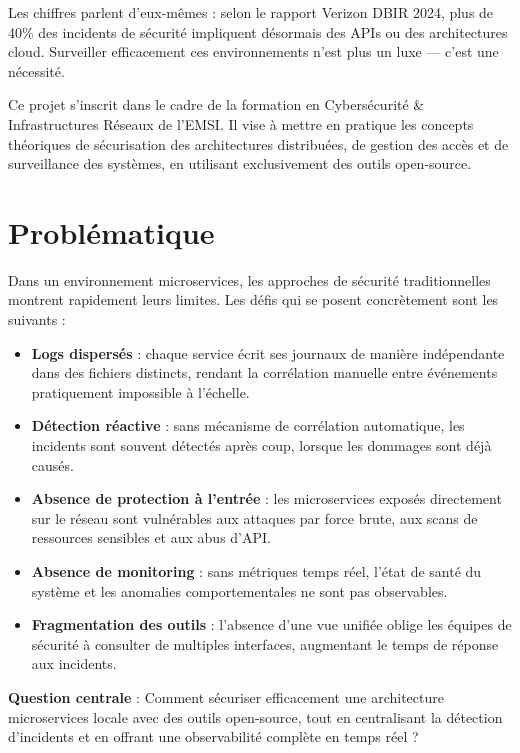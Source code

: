 \documentclass[12pt, a4paper]{report}
\begin{document}
Les chiffres parlent d'eux-mêmes : selon le rapport Verizon DBIR 2024, plus de 40\% des incidents de sécurité impliquent désormais des APIs ou des architectures cloud. Surveiller efficacement ces environnements n'est plus un luxe — c'est une nécessité.

\begin{infobox}
Ce projet s'inscrit dans le cadre de la formation en Cybersécurité \& Infrastructures Réseaux de l'EMSI. Il vise à mettre en pratique les concepts théoriques de sécurisation des architectures distribuées, de gestion des accès et de surveillance des systèmes, en utilisant exclusivement des outils open-source.
\end{infobox}

\section{Problématique}

Dans un environnement microservices, les approches de sécurité traditionnelles montrent rapidement leurs limites. Les défis qui se posent concrètement sont les suivants :

\begin{itemize}[leftmargin=*]
  \item \textbf{Logs dispersés} : chaque service écrit ses journaux de manière indépendante dans des fichiers distincts, rendant la corrélation manuelle entre événements pratiquement impossible à l'échelle.
  \item \textbf{Détection réactive} : sans mécanisme de corrélation automatique, les incidents sont souvent détectés après coup, lorsque les dommages sont déjà causés.
  \item \textbf{Absence de protection à l'entrée} : les microservices exposés directement sur le réseau sont vulnérables aux attaques par force brute, aux scans de ressources sensibles et aux abus d'API.
  \item \textbf{Absence de monitoring} : sans métriques temps réel, l'état de santé du système et les anomalies comportementales ne sont pas observables.
  \item \textbf{Fragmentation des outils} : l'absence d'une vue unifiée oblige les équipes de sécurité à consulter de multiples interfaces, augmentant le temps de réponse aux incidents.
\end{itemize}

\textbf{Question centrale} : Comment sécuriser efficacement une architecture microservices locale avec des outils open-source, tout en centralisant la détection d'incidents et en offrant une observabilité complète en temps réel ?
\end{document}
